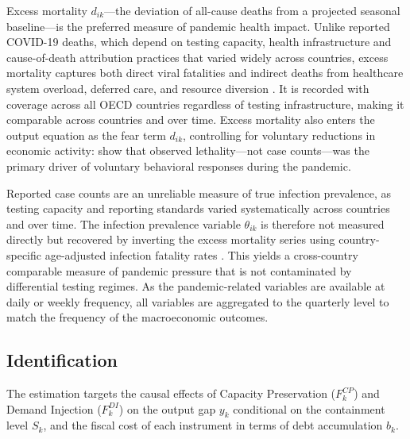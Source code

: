 \documentclass[12pt, a4paper]{article}
\begin{document}
\noindent Excess mortality $d_{ik}$---the deviation of all-cause deaths from a
projected seasonal baseline---is the preferred measure of pandemic health impact.
Unlike reported COVID-19 deaths, which depend on testing capacity, health
infrastructure and cause-of-death attribution practices that varied widely across
countries, excess mortality captures both direct viral fatalities and indirect
deaths from healthcare system overload, deferred care, and resource diversion
\citep{Msemburi2023WHO}. It is recorded with coverage across all OECD countries regardless of testing infrastructure, making it comparable across countries and over time. Excess mortality also enters the output equation as the fear term $d_{ik}$, controlling for voluntary reductions in economic activity: \citet{GOOLSBEE2021} show that observed lethality---not case counts---was the primary driver of voluntary behavioral responses during the pandemic.

Reported case counts are an unreliable measure of true infection prevalence, as
testing capacity and reporting standards varied systematically across countries
and over time. The infection prevalence variable $\theta_{ik}$ is therefore not
measured directly but recovered by inverting the excess mortality series using
country-specific age-adjusted infection fatality rates
\citep{Levin2020, COVID19ForecastingTeam2022}. This yields a cross-country
comparable measure of pandemic pressure that is not contaminated by differential
testing regimes. As the pandemic-related variables are available at daily or weekly frequency, all variables are aggregated to the quarterly level to match the frequency of the macroeconomic outcomes.


\subsection{Identification}
\label{subsec:identification}


The estimation targets the causal effects of Capacity Preservation ($F_k^{CP}$) and
Demand Injection ($F_k^{DI}$) on the output gap $y_k$ conditional on the containment
level $S_k$, and the fiscal cost of each instrument in terms of debt accumulation
$b_k$.
\end{document}
